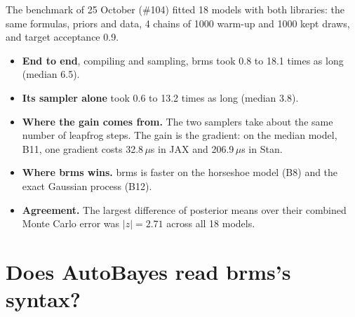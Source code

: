 \documentclass[11pt]{article}
\begin{document}
The benchmark of 25 October (\#104) fitted 18 models with both libraries: the same formulas, priors and data, 4 chains of
1000 warm-up and 1000 kept draws, and target acceptance 0.9.
\begin{itemize}
\item \textbf{End to end}, compiling and sampling, brms took 0.8 to 18.1 times as long (median 6.5).
\item \textbf{Its sampler alone} took 0.6 to 13.2 times as long (median 3.8).
\item \textbf{Where the gain comes from.} The two samplers take about the same number of leapfrog steps. The gain is the
  gradient: on the median model, B11, one gradient costs 32.8\,$\mu$s in JAX and 206.9\,$\mu$s in Stan.
\item \textbf{Where brms wins.} brms is faster on the horseshoe model (B8) and the exact Gaussian process (B12).
\item \textbf{Agreement.} The largest difference of posterior means over their combined Monte Carlo error was
  $|z| = 2.71$ across all 18 models.
\end{itemize}

\section{Does AutoBayes read brms's syntax?}
\label{sec:syntax}
\end{document}
